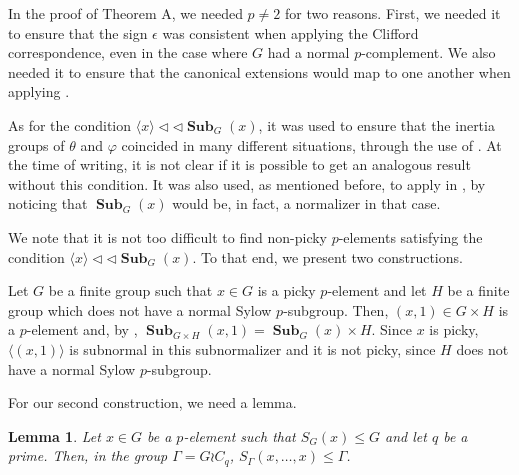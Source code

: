 \documentclass[12pt]{amsart}
\DeclareMathOperator{\Sub}{\mathbf{Sub}}
\theoremstyle{remark}
\theoremstyle{definition}
\theoremstyle{plain}
\newtheorem{lem}[thm]{Lemma}
\theoremstyle{definition}
\numberwithin{equation}{section}
\begin{document}
In the proof of Theorem A, we needed $p \neq 2$ for two reasons. First, we needed it to ensure that the sign $\epsilon$ was consistent when applying the Clifford correspondence, even in the case where $G$ had a normal $p$-complement. We also needed it to ensure that the canonical extensions would map to one another when applying .

As for the condition $\langle x \rangle {\triangleleft}{\triangleleft} \Sub_G(x)$, it was used to ensure that the inertia groups of $\theta$ and $\varphi$ coincided in many different situations, through the use of . At the time of writing, it is not clear if it is possible to get an analogous result without this condition. It was also used, as mentioned before, to apply  in , by noticing that $\Sub_G(x)$ would be, in fact, a normalizer in that case.

We note that it is not too difficult to find non-picky $p$-elements satisfying the condition $\langle x \rangle {\triangleleft}{\triangleleft} \Sub_G(x)$. To that end, we present two constructions. 

Let $G$ be a finite group such that $x \in G$ is a picky $p$-element and let $H$ be a finite group which does not have a normal Sylow $p$-subgroup. Then, $(x, 1) \in G \times H$ is a $p$-element and, by \cite[Lemma 2.13]{GunterSubnormalizer}, $\Sub_{G \times H}(x, 1) = \Sub_G(x) \times H$. Since $x$ is picky, $\langle (x, 1) \rangle$ is subnormal in this subnormalizer and it is not picky, since $H$ does not have a normal Sylow $p$-subgroup.

For our second construction, we need a lemma.

\begin{lem}
	Let $x \in G$ be a $p$-element such that $S_G(x) \leq G$ and let $q$ be a prime. Then, in the group $\Gamma = G \wr C_q$, $S_\Gamma(x, \ldots, x) \leq \Gamma$.
\end{lem}
\end{document}
